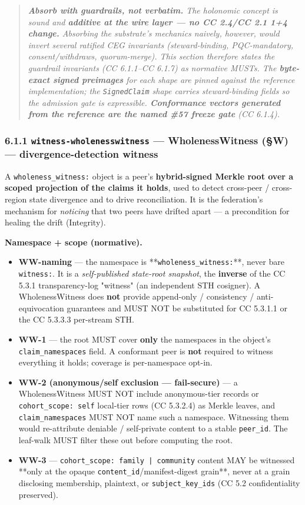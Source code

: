 \documentclass[11pt]{article}
\begin{document}
\begin{quote}\itshape \textbf{Absorb with guardrails, not verbatim.} The holonomic concept is sound and \textbf{additive at the wire layer — no CC 2.4/CC 2.1 1+4 change.} Absorbing the substrate's mechanics naively, however, would invert several ratified CEG invariants (steward-binding, PQC-mandatory, consent/withdraws, quorum-merge). This section therefore states the guardrail invariants (CC 6.1.1–CC 6.1.7) as normative MUSTs. The \textbf{byte-exact signed preimages} for each shape are pinned against the reference implementation; the \texttt{SignedClaim} shape carries steward-binding fields so the admission gate is expressible. \textbf{Conformance vectors generated from the reference are the named \#57 freeze gate} (CC 6.1.4).\end{quote}


\subsubsection*{6.1.1 \texttt{witness-wholenesswitness} — WholenessWitness (§W) — divergence-detection witness}


A \texttt{wholeness\_witness:} object is a peer's \textbf{hybrid-signed Merkle root over a scoped projection of the claims it holds}, used to detect cross-peer / cross-region state divergence and to drive reconciliation. It is the federation's mechanism for \textit{noticing} that two peers have drifted apart — a precondition for healing the drift (Integrity).


\textbf{Namespace + scope (normative).}

\begin{itemize}\setlength\itemsep{0pt}
\item \textbf{WW-naming} — the namespace is **\texttt{wholeness\_witness:}**, never bare \texttt{witness:}. It is a \textit{self-published state-root snapshot}, the \textbf{inverse} of the CC 5.3.1 transparency-log "witness" (an independent STH cosigner). A WholenessWitness does \textbf{not} provide append-only / consistency / anti-equivocation guarantees and MUST NOT be substituted for CC 5.3.1.1 or the CC 5.3.3.3 per-stream STH.
\item \textbf{WW-1} — the root MUST cover \textbf{only} the namespaces in the object's \texttt{claim\_namespaces} field. A conformant peer is \textbf{not} required to witness everything it holds; coverage is per-namespace opt-in.
\item \textbf{WW-2 (anonymous/self exclusion — fail-secure)} — a WholenessWitness MUST NOT include anonymous-tier records or \texttt{cohort\_scope: self} local-tier rows (CC 5.3.2.4) as Merkle leaves, and \texttt{claim\_namespaces} MUST NOT name such a namespace. Witnessing them would re-attribute deniable / self-private content to a stable \texttt{peer\_id}. The leaf-walk MUST filter these out before computing the root.
\item \textbf{WW-3} — \texttt{cohort\_scope: family | community} content MAY be witnessed **only at the opaque \texttt{content\_id}/manifest-digest grain**, never at a grain disclosing membership, plaintext, or \texttt{subject\_key\_ids} (CC 5.2 confidentiality preserved).
\end{itemize}
\end{document}
